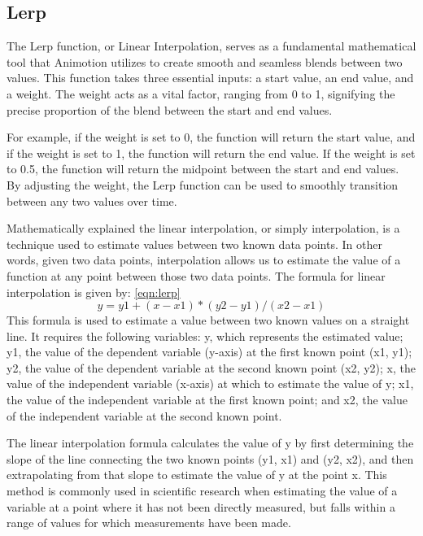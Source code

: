 \subsection{Lerp}
\label{sec:lerp}
The Lerp function, or Linear Interpolation, serves as a fundamental mathematical tool that Animotion 
utilizes to create smooth and seamless blends between two values. This function takes three essential 
inputs: a start value, an end value, and a weight. The weight acts as a vital factor, ranging from 0 to 1, 
signifying the precise proportion of the blend between the start and end values.

For example, if the weight is set to 0, the function will return the start 
value, and if the weight is set to 1, the function will return the end value. 
If the weight is set to 0.5, the function will return the midpoint between the 
start and end values. By adjusting the weight, the Lerp function can be used to 
smoothly transition between any two values over time.

Mathematically explained the linear interpolation, or simply interpolation, 
is a technique used to estimate values between two known data points. In other words, given two data points, 
interpolation allows us to estimate the value of a function at any point between those two data points.
The formula for linear interpolation is given by: \ref{eqn:lerp}
\begin{equation}
  \label{eqn:lerp}
	y = y1 + (x - x1) * (y2 - y1) / (x2 - x1)
\end{equation}
This formula is used to estimate a value between two known values on a straight line. It requires the following variables: y, 
which represents the estimated value; y1, the value of the dependent variable (y-axis) at the first known point (x1, y1); y2, 
the value of the dependent variable at the second known point (x2, y2); x, the value of the independent variable (x-axis) 
at which to estimate the value of y; x1, the value of the independent variable at the first known point; and x2, the value 
of the independent variable at the second known point.

The linear interpolation formula calculates the value of y by first determining the slope of the line connecting the two 
known points (y1, x1) and (y2, x2), and then extrapolating from that slope to estimate the value of y at the point x. 
This method is commonly used in scientific research when estimating the value of a variable at a point where it has not 
been directly measured, but falls within a range of values for which measurements have been made.


